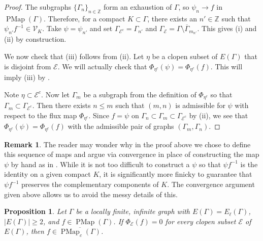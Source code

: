 \documentclass[11pt]{amsart}
\theoremstyle{plain}
\newtheorem{PROP}[THM]{Proposition}
\theoremstyle{definition}
\newtheorem{RMK}[THM]{Remark}
\DeclareMathOperator{\PMap}{PMap}
\newcommand{\Z}{\mathbb{Z}}
\newcommand{\cE}{\mathcal{E}}
\newcommand{\cV}{\mathcal{V}}
\def\G{{\Gamma}}
\newcommand{\<}{\langle}
\renewcommand{\>}{\rangle}
\begin{document}
\begin{proof}
    The subgraphs $\{\G_{n}\}_{n \in \Z}$ form an exhaustion of $\G$, so $\psi_{n} \rightarrow f$ in $\PMap(\G)$. Therefore, for a compact $K \subset \G$, there exists an $n'\in \Z$ such that $\psi_{n'}f^{-1} \in \cV_{K}$. Take $\psi = \psi_{n'}$ and set $\G_{\cE^{c}} = \G_{n'}$ and $\G_{\cE} = \overline{\G \setminus \G_{m_{n'}}}$. This gives (i) and (ii) by construction.
    
    We now check that (iii) follows from (ii). Let $\eta$ be a clopen subset of $E(\G)$ that is disjoint from $\cE$. We will actually check that $\Phi_{\eta^{c}}(\psi) = \Phi_{\eta^{c}}(f)$. This will imply (iii) by .

    Note $\eta \subset \cE^c$. Now let $\G_{m}$ be a subgraph from the definition of $\Phi_{\eta^{c}}$ so that $\G_{m} \subset \G_{\cE^{c}}$.
    Then there exists $n \le m$ such that $(m,n)$ is admissible for $\psi$ with respect to the flux map $\Phi_{\eta^c}$. Since $f=\psi$ on $\G_n \subset \G_m \subset \G_{\cE^{c}}$ by (ii), we see that $\Phi_{\eta^c}(\psi) = \Phi_{\eta^c}(f)$ with the admissible pair of graphs $(\G_m,\G_n)$.
\end{proof}

\begin{RMK}
    The reader may wonder why in the proof above we chose to define this sequence of maps and argue via convergence in place of constructing the map $\psi$ by hand as in \cite{APV2020}. While it is not too difficult to construct a $\psi$ so that $\psi f^{-1}$ is the identity on a given compact $K$, it is significantly more finicky to guarantee that $\psi f^{-1}$ preserves the complementary components of $K$. The convergence argument given above allows us to avoid the messy details of this.
\end{RMK}

\begin{PROP}\label{prop:coregraphcase}
    Let $\G$ be a locally finite, infinite graph with $E(\G) = E_{\ell}(\G)$, $|E(\G)| \geq 2$, and $f \in \PMap(\G)$. If $\Phi_{{\cE}}(f) = 0$ for every clopen subset $\cE$ of $E(\G)$, then $f \in \overline{\PMap_c(\G)}$.
\end{PROP}
\end{document}
